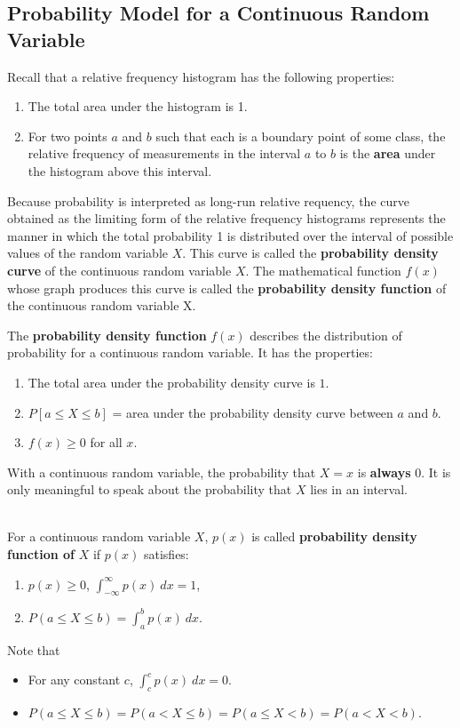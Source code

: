 \documentclass[12pt,openany]{book}
\theoremstyle{definition}
\newcommand{\dispsty}{\displaystyle}
\begin{document}
	\subsection{Probability Model for a Continuous Random Variable}
	Recall that a relative frequency histogram has the following properties: \begin{enumerate}
		\item The total area under the histogram is 1.
		\item  For two points $a$ and $b$ such that each is a boundary point of some class, the relative frequency of measurements in the interval $a$ to $b$ is the \textbf{area} under the histogram above this interval.
	\end{enumerate}
	Because probability is interpreted as long-run relative requency, the curve obtained as the limiting form of the relative frequency histograms represents the manner in which the total probability 1 is distributed over the interval of possible values of the random variable $X$. This curve is called the \textbf{probability density curve} of the continuous random variable $X$. The mathematical function $f(x)$ whose graph produces this curve is called the \textbf{probability density function} of the continuous random variable X.
	\\ 
	\begin{tcolorbox}[colback=white]
		The \textbf{probability density function} $f(x)$ describes the distribution of probability for a continuous random variable. It has the properties: \begin{enumerate}
			\item The total area under the probability density curve is $1$.
			\item $P[a\leq X\leq b]$ = area under the probability density curve between $a$ and $b$.
			\item $f(x)\geq 0$ for all $x$.
		\end{enumerate}
	\end{tcolorbox}
	\begin{tcolorbox}[colback=white]
		With a continuous random variable, the probability that $X=x$ is \textbf{always} 0. It is only meaningful to speak about the probability that $X$ lies in an interval.
	\end{tcolorbox}\ \\
	For a continuous random variable $X$, $p(x)$ is called \textbf{probability density function of} $X$ if $p(x)$ satisfies: \begin{enumerate}
		\item $p(x)\geq 0$, $\dispsty\int_{-\infty}^{\infty}p(x)\ dx=1$,
		\item $P(a\leq X\leq b)=\dispsty\int_{a}^bp(x)\ dx$.
	\end{enumerate}
	Note that
	\begin{itemize}
		\item For any constant $c$, $\dispsty\int_{c}^cp(x)\ dx=0$.
		\item $P(a\leq X\leq b)=P(a< X\leq b)=P(a\leq X< b)=P(a< X< b)$.
	\end{itemize}
	
\end{document}
